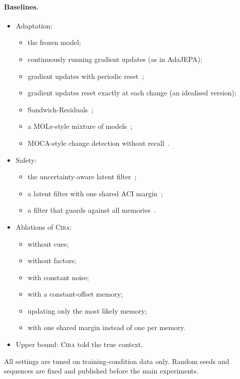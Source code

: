 \documentclass[10pt]{article}
\newcommand{\method}{\textsc{Cira}}
\begin{document}
\paragraph{Baselines.}
\begin{itemize}
  \item Adaptation:
  \begin{itemize}
    \item the frozen model;
    \item continuously running gradient updates (as in AdaJEPA);
    \item gradient updates with periodic reset~\cite{press2023rdumb};
    \item gradient updates reset exactly at each change (an idealised version);
    \item Sandwich-Residuals~\cite{soni2026sandwich};
    \item a MOLe-style mixture of models~\cite{nagabandi2019mole};
    \item MOCA-style change detection without recall~\cite{harrison2020moca}.
  \end{itemize}
  \item Safety:
  \begin{itemize}
    \item the uncertainty-aware latent filter~\cite{seo2025uncertainty};
    \item a latent filter with one shared ACI margin~\cite{huriot2026safe};
    \item a filter that guards against all memories~\cite{lucia2013multistage}.
  \end{itemize}
  \item Ablations of \method{}:
  \begin{itemize}
    \item without cues;
    \item without factors;
    \item with constant noise;
    \item with a constant-offset memory;
    \item updating only the most likely memory;
    \item with one shared margin instead of one per memory.
  \end{itemize}
  \item Upper bound: \method{} told the true context.
\end{itemize}
All settings are tuned on training-condition data only. Random seeds and sequences are fixed and
published before the main experiments.
\end{document}
